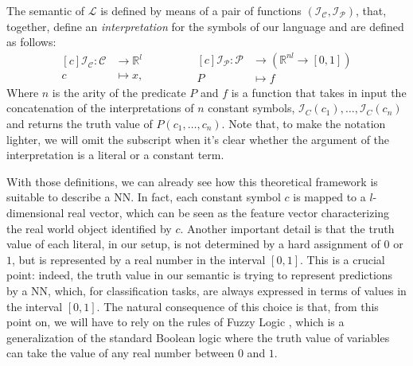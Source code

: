 \begin{definition}
	The semantic of $\mathcal{L}$ is defined by means of a pair of functions $\left( \mathcal{I}_{\mathcal{C}}, \mathcal{I}_{\mathcal{P}} \right)$, that, together, define an \textit{interpretation} for the symbols of our language and are defined as follows:
	\begin{equation}
	\begin{aligned}[c]
			\mathcal{I}_{\mathcal{C}}: \mathcal{C} &\longrightarrow \mathbb{R}^l\\
			c&\longmapsto x,
	\end{aligned}
	\qquad \qquad
	\begin{aligned}[c]
	\mathcal{I}_{\mathcal{P}}: \mathcal{P} &\longrightarrow \left( \mathbb{R}^{nl} \rightarrow \left[0,1\right] \right)\\
	P &\longmapsto f
	\end{aligned}
	\end{equation}	
	Where $n$ is the arity of the predicate $P$ and $f$ is a function that takes in input the concatenation of the interpretations of $n$ constant symbols, $\mathcal{I}_C(c_1), \dots, \mathcal{I}_C(c_n)$ and returns the truth value of $P(c_1,\dots,c_n)$. Note that, to make the notation lighter, we will omit the subscript when it's clear whether the argument of the interpretation is a literal or a constant term.
\end{definition}

With those definitions, we can already see how this theoretical framework is suitable to describe a NN. In fact, each constant symbol $c$ is mapped to a $l$-dimensional real vector, which can be seen as the feature vector characterizing the real world object identified by $c$. Another important detail is that the truth value of each literal, in our setup, is not determined by a hard assignment of $0$ or $1$, but is represented by a real number in the interval $\left[ 0,1 \right]$. This is a crucial point: indeed, the truth value in our semantic is trying to represent predictions by a NN, which, for classification tasks, are always expressed in terms of values in the interval $\left[0,1\right]$. The natural consequence of this choice is that, from this point on, we will have to rely on the rules of Fuzzy Logic \cite{novak1987first}, which is a generalization of the standard Boolean logic where the truth value of variables can take the value of any real number between $0$ and $1$. 

